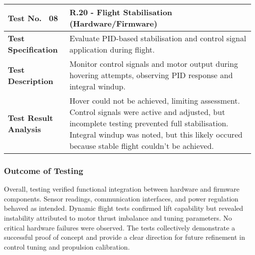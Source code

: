 \begin{table}[H]
\centering
\renewcommand{\arraystretch}{1.2}
\begin{tabular}{|p{3.5cm}|p{12cm}|}
\hline
\textbf{Test No. \, 08} & \textbf{R.20 - Flight Stabilisation} (Hardware/Firmware) \\ \hline
\textbf{Test Specification} & 
Evaluate PID-based stabilisation and control signal application during flight. \\ \hline
\textbf{Test Description} & 
Monitor control signals and motor output during hovering attempts, observing PID response and integral windup. \\ \hline
\textbf{Test Result Analysis} & 
Hover could not be achieved, limiting assessment. Control signals were active and adjusted, but incomplete testing prevented full stabilisation. Integral windup was noted, but this likely occured because stable flight couldn't be achieved. \\ \hline
\end{tabular}
\end{table}

\subsubsection{Outcome of Testing} \leavevmode

Overall, testing verified functional integration between hardware and firmware components. Sensor readings, communication interfaces, and power regulation behaved as intended. Dynamic flight tests confirmed lift capability but revealed instability attributed to motor thrust imbalance and tuning parameters. No critical hardware failures were observed. The tests collectively demonstrate a successful proof of concept and provide a clear direction for future refinement in control tuning and propulsion calibration.